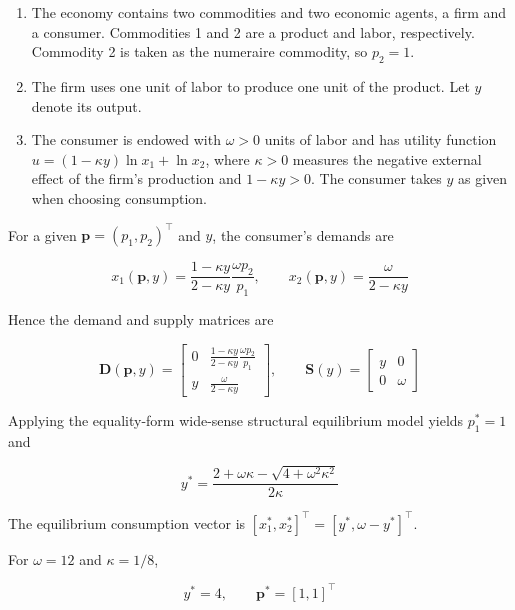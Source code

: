 \documentclass[
  letterpaper,
  DIV=11,
  numbers=noendperiod]{scrreprt}
\begin{document}
\begin{enumerate}
\def\labelenumi{\arabic{enumi}.}
\item
  The economy contains two commodities and two economic agents, a firm
  and a consumer. Commodities 1 and 2 are a product and labor,
  respectively. Commodity 2 is taken as the numeraire commodity, so
  \(p_2=1\).
\item
  The firm uses one unit of labor to produce one unit of the product.
  Let \(y\) denote its output.
\item
  The consumer is endowed with \(\omega>0\) units of labor and has
  utility function \(u=(1-\kappa y)\ln x_1+\ln x_2\), where \(\kappa>0\)
  measures the negative external effect of the firm's production and
  \(1-\kappa y>0\). The consumer takes \(y\) as given when choosing
  consumption.
\end{enumerate}

For a given \(\mathbf p=(p_1,p_2)^\top\) and \(y\), the consumer's
demands are

\[
x_1(\mathbf p,y)=\frac{1-\kappa y}{2-\kappa y}\frac{\omega p_2}{p_1},
\qquad
x_2(\mathbf p,y)=\frac{\omega}{2-\kappa y}
\]

Hence the demand and supply matrices are

\[
\mathbf D(\mathbf p,y)=
\begin{bmatrix}
0&\frac{1-\kappa y}{2-\kappa y}\frac{\omega p_2}{p_1}\\
y&\frac{\omega}{2-\kappa y}
\end{bmatrix},
\qquad
\mathbf S(y)=
\begin{bmatrix}
y&0\\
0&\omega
\end{bmatrix}
\]

Applying the equality-form wide-sense structural equilibrium model
yields \(p_1^*=1\) and

\[
y^*=
\frac{2+\omega\kappa-\sqrt{4+\omega^2\kappa^2}}
{2\kappa}
\]

The equilibrium consumption vector is
\([x_1^*,x_2^*]^\top=[y^*,\omega-y^*]^\top\).

For \(\omega=12\) and \(\kappa=1/8\),

\[
y^*=4,
\qquad
\mathbf p^*=[1,1]^\top
\]
\end{document}
